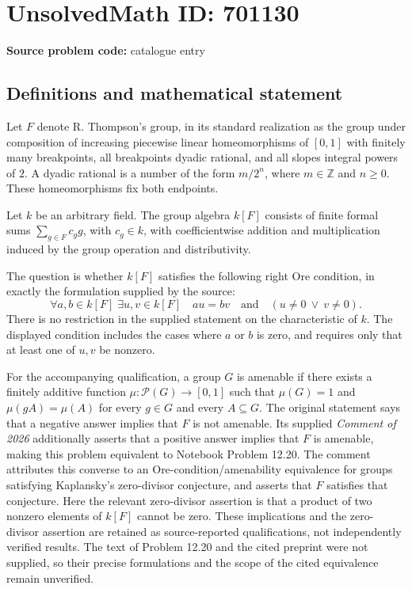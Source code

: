 \documentclass[11pt]{article}
\newcommand{\Z}{\mathbb{Z}}
\begin{document}
\section*{UnsolvedMath ID: 701130}
\textbf{Source problem code:} catalogue entry
\subsection{Definitions and mathematical statement}
Let \(F\) denote R. Thompson's group, in its standard realization as the group under composition of increasing piecewise linear homeomorphisms of \([0,1]\) with finitely many breakpoints, all breakpoints dyadic rational, and all slopes integral powers of \(2\). A dyadic rational is a number of the form \(m/2^n\), where \(m\in\Z\) and \(n\geq 0\). These homeomorphisms fix both endpoints.

Let \(k\) be an arbitrary field. The group algebra \(k[F]\) consists of finite formal sums \(\sum_{g\in F}c_g g\), with \(c_g\in k\), with coefficientwise addition and multiplication induced by the group operation and distributivity.

The question is whether \(k[F]\) satisfies the following right Ore condition, in exactly the formulation supplied by the source:
\[
\forall a,b\in k[F]\;\exists u,v\in k[F]\quad
au=bv\quad\text{and}\quad(u\neq 0\ \lor\ v\neq 0).
\]
There is no restriction in the supplied statement on the characteristic of \(k\). The displayed condition includes the cases where \(a\) or \(b\) is zero, and requires only that at least one of \(u,v\) be nonzero.

For the accompanying qualification, a group \(G\) is amenable if there exists a finitely additive function \(\mu:\mathcal P(G)\to[0,1]\) such that \(\mu(G)=1\) and \(\mu(gA)=\mu(A)\) for every \(g\in G\) and every \(A\subseteq G\). The original statement says that a negative answer implies that \(F\) is not amenable. Its supplied \emph{Comment of 2026} additionally asserts that a positive answer implies that \(F\) is amenable, making this problem equivalent to Notebook Problem 12.20. The comment attributes this converse to an Ore-condition/amenability equivalence for groups satisfying Kaplansky's zero-divisor conjecture, and asserts that \(F\) satisfies that conjecture. Here the relevant zero-divisor assertion is that a product of two nonzero elements of \(k[F]\) cannot be zero. These implications and the zero-divisor assertion are retained as source-reported qualifications, not independently verified results. The text of Problem 12.20 and the cited preprint were not supplied, so their precise formulations and the scope of the cited equivalence remain unverified.
\end{document}
